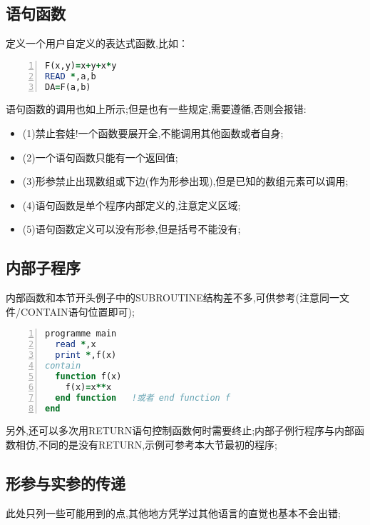 
\subsection{语句函数}
定义一个用户自定义的表达式函数,比如：
\begin{lstlisting}[numbers=left,frame=single,language=Fortran]
F(x,y)=x+y+x*y
READ *,a,b
DA=F(a,b)
\end{lstlisting}
\par
语句函数的调用也如上所示;但是也有一些规定,需要遵循,否则会报错:

\begin{itemize}
	\item{(1)禁止套娃!一个函数要展开全,不能调用其他函数或者自身;}
	\item{(2)一个语句函数只能有一个返回值;}
	\item{(3)形参禁止出现数组或下边(作为形参出现),但是已知的数组元素可以调用;}
	\item{(4)语句函数是单个程序内部定义的,注意定义区域;}
	\item{(5)语句函数定义可以没有形参,但是括号不能没有;}
\end{itemize}



\subsection{内部子程序}
内部函数和本节开头例子中的SUBROUTINE结构差不多,可供参考(注意同一文件/CONTAIN语句位置即可);

\begin{lstlisting}[numbers=left,frame=single,language=Fortran]
programme main
  read *,x
  print *,f(x)
contain
  function f(x)
    f(x)=x**x
  end function   !或者 end function f
end
\end{lstlisting}
\par

另外,还可以多次用RETURN语句控制函数何时需要终止;内部子例行程序与内部函数相仿,不同的是没有RETURN,示例可参考本大节最初的程序;



\subsection{形参与实参的传递}
此处只列一些可能用到的点,其他地方凭学过其他语言的直觉也基本不会出错;\par

